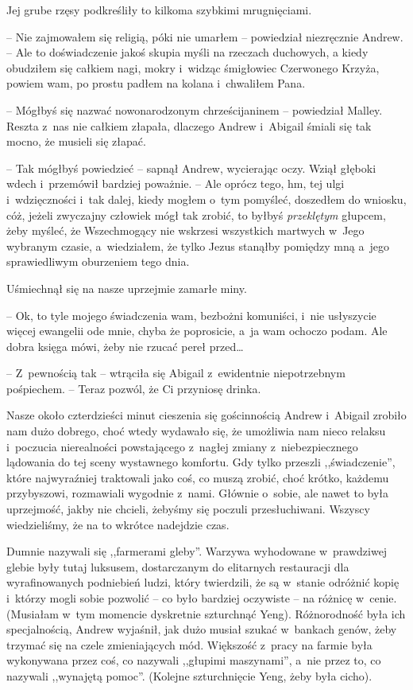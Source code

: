 \documentclass[oneside,polish,11pt,sfheadings]{mwbk}
\begin{document}
Jej grube rzęsy podkreśliły to kilkoma szybkimi mrugnięciami.

-- Nie zajmowałem się religią, póki nie umarłem -- powiedział niezręcznie
Andrew. -- Ale to doświadczenie jakoś skupia myśli na rzeczach duchowych,
a kiedy obudziłem się całkiem nagi, mokry i~widząc śmigłowiec Czerwonego
Krzyża, powiem wam, po prostu padłem na kolana i~chwaliłem Pana.

-- Mógłbyś się nazwać nowonarodzonym chrześcijaninem -- powiedział Malley.
Reszta z~nas nie całkiem złapała, dlaczego Andrew i~Abigail śmiali się
tak mocno, że musieli się złapać.

-- Tak mógłbyś powiedzieć -- sapnął Andrew, wycierając oczy. Wziął głęboki
wdech i~przemówił bardziej poważnie. -- Ale oprócz tego, hm, tej ulgi i~wdzięczności i~tak dalej, kiedy mogłem o~tym pomyśleć, doszedłem do
wniosku, cóż, jeżeli zwyczajny człowiek mógł tak zrobić, to byłbyś
\textit{przeklętym} głupcem, żeby myśleć, że Wszechmogący nie wskrzesi
wszystkich martwych w~Jego wybranym czasie, a~wiedziałem, że tylko Jezus
stanąłby pomiędzy mną a~jego sprawiedliwym oburzeniem tego dnia.

Uśmiechnął się na nasze uprzejmie zamarłe miny. 

-- Ok, to tyle mojego
świadczenia wam, bezbożni komuniści, i~nie usłyszycie więcej ewangelii
ode mnie, chyba że poprosicie, a~ja wam ochoczo podam. Ale dobra księga
mówi, żeby nie rzucać pereł przed\ldots 

-- Z~pewnością tak -- wtrąciła się Abigail z~ewidentnie niepotrzebnym
pośpiechem. -- Teraz pozwól, że Ci przyniosę drinka.

Nasze około czterdzieści minut cieszenia się gościnnością Andrew i~Abigail zrobiło nam dużo dobrego, choć wtedy wydawało się, że umożliwia
nam nieco relaksu i~poczucia nierealności powstającego z~nagłej zmiany z~niebezpiecznego lądowania do tej sceny wystawnego komfortu. Gdy tylko
przeszli ,,świadczenie'', które najwyraźniej traktowali jako coś, co
muszą zrobić, choć krótko, każdemu przybyszowi, rozmawiali wygodnie z~nami. Głównie o~sobie, ale nawet to była uprzejmość, jakby nie chcieli,
żebyśmy się poczuli przesłuchiwani. Wszyscy wiedzieliśmy, że na to
wkrótce nadejdzie czas.

Dumnie nazywali się ,,farmerami gleby''. Warzywa wyhodowane w~prawdziwej
glebie były tutaj luksusem, dostarczanym do elitarnych restauracji dla
wyrafinowanych podniebień ludzi, który twierdzili, że są w~stanie
odróżnić kopię i~którzy mogli sobie pozwolić -- co było bardziej
oczywiste -- na różnicę w~cenie. (Musiałam w~tym momencie dyskretnie
szturchnąć Yeng). Różnorodność była ich specjalnością, Andrew wyjaśnił,
jak dużo musiał szukać w~bankach genów, żeby trzymać się na czele
zmieniających mód. Większość z~pracy na farmie była wykonywana przez
coś, co nazywali ,,głupimi maszynami'', a~nie przez to, co nazywali
,,wynajętą pomoc''. (Kolejne szturchnięcie Yeng, żeby była cicho).
\end{document}
